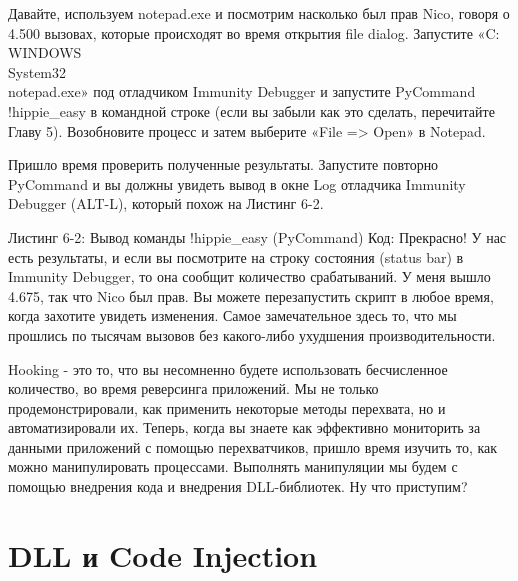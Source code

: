 \documentclass[12pt]{book}
\begin{document}
Давайте, используем notepad.exe и посмотрим насколько был прав Nico, говоря о 4.500 вызовах, которые происходят во время открытия file dialog. Запустите «C:\\WINDOWS\\System32\\notepad.exe» под отладчиком Immunity Debugger и запустите PyCommand !hippie\_easy в командной строке (если вы забыли как это сделать, перечитайте Главу 5). Возобновите процесс и затем выберите «File => Open» в Notepad.

Пришло время проверить полученные результаты. Запустите повторно PyCommand и вы должны увидеть вывод в окне Log отладчика Immunity Debugger (ALT-L), который похож на Листинг 6-2.

Листинг 6-2: Вывод команды !hippie\_easy (PyCommand)
Код:
Прекрасно! У нас есть результаты, и если вы посмотрите на строку состояния (status bar) в Immunity Debugger, то она сообщит количество срабатываний. У меня вышло 4.675, так что Nico был прав. Вы можете перезапустить скрипт в любое время, когда захотите увидеть изменения. Самое замечательное здесь то, что мы прошлись по тысячам вызовов без какого-либо ухудшения производительности. 

Hooking - это то, что вы несомненно будете использовать бесчисленное количество, во время реверсинга приложений. Мы не только продемонстрировали, как применить некоторые методы перехвата, но и автоматизировали их. Теперь, когда вы знаете как эффективно мониторить за данными приложений с помощью перехватчиков, пришло время изучить то, как можно манипулировать процессами. Выполнять манипуляции мы будем с помощью внедрения кода и внедрения DLL-библиотек. Ну что приступим? 

\chapter{DLL и Code Injection}
\end{document}
